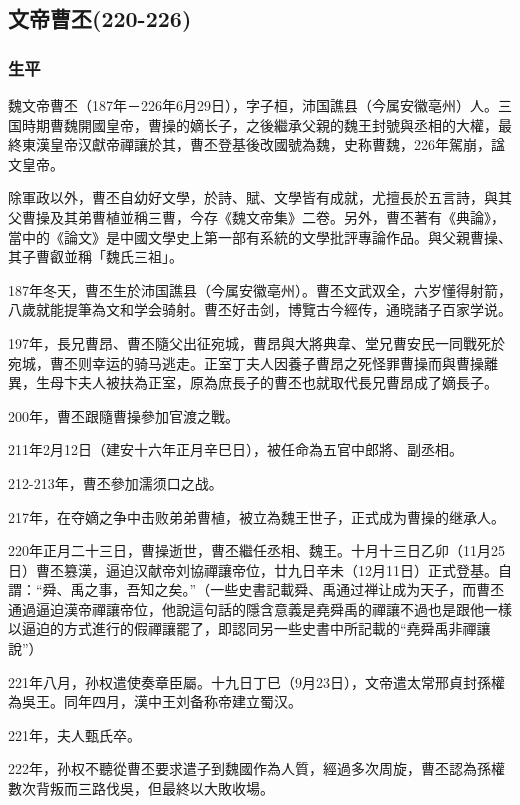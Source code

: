 
\subsection{文帝曹丕\tiny(220-226)}

\subsubsection{生平}

魏文帝曹丕（187年－226年6月29日），字子桓，沛国譙县（今属安徽亳州）人。三国時期曹魏開國皇帝，曹操的嫡长子，之後繼承父親的魏王封號與丞相的大權，最終東漢皇帝汉獻帝禪讓於其，曹丕登基後改國號為魏，史称曹魏，226年駕崩，諡文皇帝。

除軍政以外，曹丕自幼好文學，於詩、賦、文學皆有成就，尤擅長於五言詩，與其父曹操及其弟曹植並稱三曹，今存《魏文帝集》二卷。另外，曹丕著有《典論》，當中的《論文》是中國文學史上第一部有系統的文學批評專論作品。與父親曹操、其子曹叡並稱「魏氏三祖」。

187年冬天，曹丕生於沛国譙县（今属安徽亳州）。曹丕文武双全，六岁懂得射箭，八歲就能提筆為文和学会骑射。曹丕好击剑，博覽古今經传，通晓諸子百家学说。

197年，長兄曹昂、曹丕隨父出征宛城，曹昂與大將典韋、堂兄曹安民一同戰死於宛城，曹丕则幸运的骑马逃走。正室丁夫人因養子曹昂之死怪罪曹操而與曹操離異，生母卞夫人被扶為正室，原為庶長子的曹丕也就取代長兄曹昂成了嫡長子。

200年，曹丕跟隨曹操參加官渡之戰。

211年2月12日（建安十六年正月辛巳日），被任命為五官中郎將、副丞相。

212-213年，曹丕參加濡须口之战。

217年，在夺嫡之争中击败弟弟曹植，被立為魏王世子，正式成为曹操的继承人。

220年正月二十三日，曹操逝世，曹丕繼任丞相、魏王。十月十三日乙卯（11月25日）曹丕篡漢，逼迫汉献帝刘協禪讓帝位，廿九日辛未（12月11日）正式登基。自謂：“舜、禹之事，吾知之矣。”（一些史書記載舜、禹通过禅让成为天子，而曹丕通過逼迫漢帝禪讓帝位，他說這句話的隱含意義是堯舜禹的禪讓不過也是跟他一樣以逼迫的方式進行的假禪讓罷了，即認同另一些史書中所記載的“堯舜禹非禪讓說”）

221年八月，孙权遣使奏章臣屬。十九日丁巳（9月23日），文帝遣太常邢貞封孫權為吳王。同年四月，漢中王刘备称帝建立蜀汉。

221年，夫人甄氏卒。

222年，孙权不聽從曹丕要求遣子到魏國作為人質，經過多次周旋，曹丕認為孫權數次背叛而三路伐吳，但最終以大敗收場。

